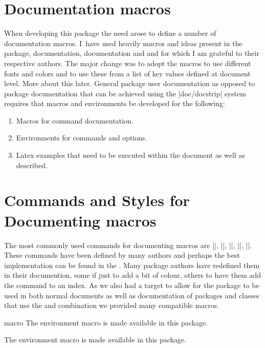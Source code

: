 \section{Documentation macros}

When developing this package the need arose to define a number of documentation macros. I~have used heavily macros and ideas present in the  package,  documentation,  documentation  and  and for which I am grateful to their respective authors. The major change was to adopt the macros to use different fonts and colors and to use these from a list of key values defined at document level. More about this later. General package user documentation as opposed to package documentation that can be achieved using the |doc/docstrip| system requires that macros and environments be developed for the following:

\begin{enumerate}
\item Macros for command documentation.
\item Environments for commands and options.
\item Latex examples that need to be executed within the document as well as described.
\end{enumerate}


\section{Commands and Styles for Documenting macros}

The most commonly used commands for documenting macros are |\cs|, |\cmd|, |\meta|, |\marg|, |\oarg|. These commands have been defined by many authors and perhaps the best implementation can be found in the . Many package authors have redefined them in their documention, some if just to add a bit of colour, others to have them add the command to an index. As we also had a target to allow for
the package to be used in both normal documents as well as documentation
of packages and classes that use the  and  combination we provided many compatible macros.

\begin{environment}{macro} The environment macro is made available in this
package. 
\end{environment}

 The environment macro is made available in this package. 

